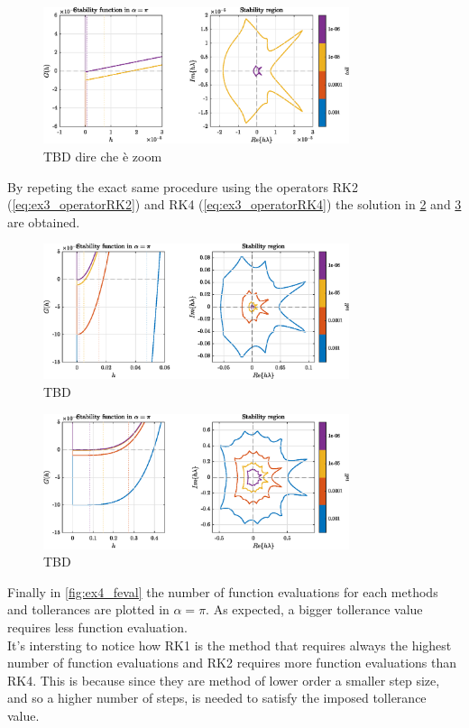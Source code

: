 \documentclass[11pt,a4paper,oneside]{article}
\begin{document}
\begin{figure}[htb]
    \centering
    \includegraphics*[width=0.8\textwidth, keepaspectratio]{ex4_RK1zoom.eps}
    \caption[]{\label{fig:ex4_RK1zoom} TBD dire che è zoom}
\end{figure}

By repeting the exact same procedure using the operators RK2 (\cref{eq:ex3_operatorRK2}) and RK4 (\cref{eq:ex3_operatorRK4}) the solution in \cref{fig:ex4_RK2} and \cref{fig:ex4_RK4} are obtained.
\begin{figure}[htb]
    \centering
    \includegraphics*[width=0.8\textwidth, keepaspectratio]{ex4_RK2.eps}
    \caption[]{\label{fig:ex4_RK2} TBD}
\end{figure}
\begin{figure}[htb]
    \centering
    \includegraphics*[width=0.8\textwidth, keepaspectratio]{ex4_RK4.eps}
    \caption[]{\label{fig:ex4_RK4} TBD}
\end{figure}

Finally in \cref{fig:ex4_feval} the number of function evaluations for each methods and tollerances are plotted in $\alpha = \pi$.
As expected, a bigger tollerance value requires less function evaluation.\\
It's intersting to notice how RK1 is the method that requires always the highest number of function evaluations and RK2 requires more function evaluations than RK4.
This is because since they are method of lower order a smaller step size, and so a higher number of steps, is needed to satisfy the imposed tollerance value.
\end{document}
